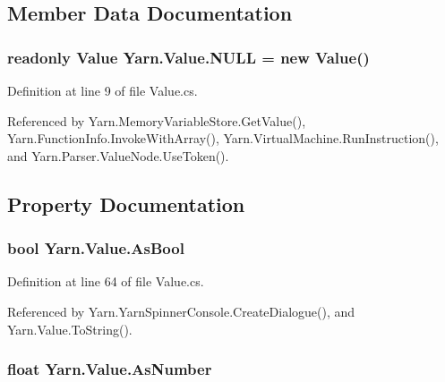 \subsection{Member Data Documentation}
\hypertarget{a00187_a1ed2964965baca8621c45efa23f37660}{
\subsubsection[{N\-U\-L\-L}]{\setlength{\rightskip}{0pt plus 5cm}readonly {\bf Value} Yarn.\-Value.\-N\-U\-L\-L = new {\bf Value}()\hspace{0.3cm}{\ttfamily [static]}}}\label{a00187_a1ed2964965baca8621c45efa23f37660}


Definition at line 9 of file Value.\-cs.



Referenced by Yarn.\-Memory\-Variable\-Store.\-Get\-Value(), Yarn.\-Function\-Info.\-Invoke\-With\-Array(), Yarn.\-Virtual\-Machine.\-Run\-Instruction(), and Yarn.\-Parser.\-Value\-Node.\-Use\-Token().



\subsection{Property Documentation}
\hypertarget{a00187_a5805faef3b3d376090ff096d6dd6c064}{
\subsubsection[{As\-Bool}]{\setlength{\rightskip}{0pt plus 5cm}bool Yarn.\-Value.\-As\-Bool\hspace{0.3cm}{\ttfamily [get]}}}\label{a00187_a5805faef3b3d376090ff096d6dd6c064}


Definition at line 64 of file Value.\-cs.



Referenced by Yarn.\-Yarn\-Spinner\-Console.\-Create\-Dialogue(), and Yarn.\-Value.\-To\-String().

\hypertarget{a00187_a751419743761562bf902246d6e6a3c0a}{
\subsubsection[{As\-Number}]{\setlength{\rightskip}{0pt plus 5cm}float Yarn.\-Value.\-As\-Number\hspace{0.3cm}{\ttfamily [get]}}}\label{a00187_a751419743761562bf902246d6e6a3c0a}


